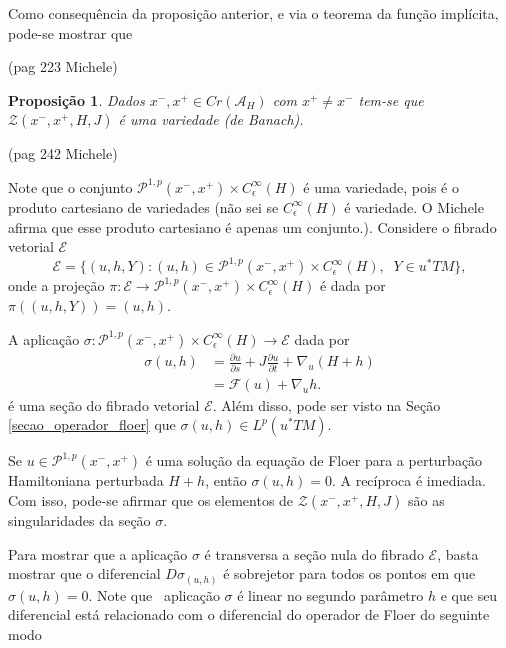 \documentclass[12pt]{book}
\newtheorem{proposicao}[teorema]{Proposição}
\newcommand{\caminhosexponenciaisconectantes}[2]{\mathcal{P}^{1,p}(#1, #2)}
\newcommand{\caminhosexponenciaisconectantespadrao}{\caminhosexponenciaisconectantes{x^{-}}{x^{+}}}
\newcommand{\derivadaparcial}[2]{\frac{\partial #1}{\partial #2}}
\newcommand{\espacoLp}[1]{L^{p}(#1)}
\newcommand{\funcionalH}{\mathcal{A}_{H}}
\newcommand{\operadorFloer}{\mathcal{F}}
\newcommand{\orbitasConectantesZ}{\mathcal{Z}(x^{-}, x^{+},H, J)}
\newcommand{\perturbacaoHamiltoniana}[1]{C^{\infty}_{\epsilon}(#1)}
\newcommand{\pontoscriticos}[1]{\textit{Cr}(#1)}
\newcommand{\pullbackfibradotangente}[2]{#1^{*}T#2}
\newcommand{\pullbackfibradotangenteM}[1]{\pullbackfibradotangente{#1}{M}}
\newcommand{\aviso}[1]{{\color{violet}(#1)}}
\newcommand{\alerta}[1]{{\color{red}#1}}
\begin{document}
	Como consequência da proposição anterior, e via o teorema da função implícita, pode-se mostrar que
	
	\aviso{pag 223 Michele}
	
	\begin{proposicao}
	Dados $x^{-},x^{+}\in \pontoscriticos{\funcionalH}$ com $x^{+}\neq  x^{-}$ tem-se que $\orbitasConectantesZ$ é uma variedade (de Banach). 
	\end{proposicao}
	
	\aviso{pag 242 Michele}
	
	Note que o conjunto $\caminhosexponenciaisconectantespadrao\times \perturbacaoHamiltoniana{H}$ é uma variedade, pois é o produto cartesiano de variedades \alerta{(não sei se $\perturbacaoHamiltoniana{H}$ é variedade. O Michele afirma que esse produto cartesiano é apenas um conjunto.)}. Considere o fibrado vetorial $\mathcal{E} $
	$$
	\mathcal{E} = \{(u, h, Y): (u, h)\in \caminhosexponenciaisconectantespadrao\times \perturbacaoHamiltoniana{H},\;\;Y\in \pullbackfibradotangenteM{u}\},
	$$
	onde a projeção $\pi:\mathcal{E}\to \caminhosexponenciaisconectantespadrao\times \perturbacaoHamiltoniana{H}$ é dada por $\pi((u, h, Y)) = (u, h)$.
	
	A aplicação $\sigma:\caminhosexponenciaisconectantespadrao\times \perturbacaoHamiltoniana{H}\to \mathcal{E}$ dada por 
	$$
	\begin{aligned}
	\sigma(u,h) &=\derivadaparcial{u}{s}+J\derivadaparcial{u}{t}+\nabla_{u}(H+h)\\
	&= \operadorFloer(u) +\nabla_{u}h.
	\end{aligned}
	$$
	é uma seção do fibrado vetorial $\mathcal{E}$. Além disso, pode ser visto na Seção \ref{secao_operador_floer} que $\sigma(u,h)\in \espacoLp{\pullbackfibradotangenteM{u}}$.
	
	Se $u \in \caminhosexponenciaisconectantespadrao$ é uma solução da equação de Floer para a perturbação Hamiltoniana perturbada $H+h$, então $\sigma(u, h) = 0$. A recíproca é imediada. Com isso, pode-se afirmar que os elementos de $\orbitasConectantesZ$ são as singularidades da seção $\sigma$. 
	
	Para mostrar que a aplicação $\sigma$ é transversa a seção nula do fibrado $\mathcal{E}$, basta mostrar que o diferencial $D\sigma_{(u,h)}$ é sobrejetor para todos os pontos em que $\sigma(u,h) = 0$. Note que \ aplicação $\sigma$ é linear no segundo parâmetro $h$ e que seu diferencial está relacionado com o diferencial do operador de Floer do seguinte modo
	
\end{document}
